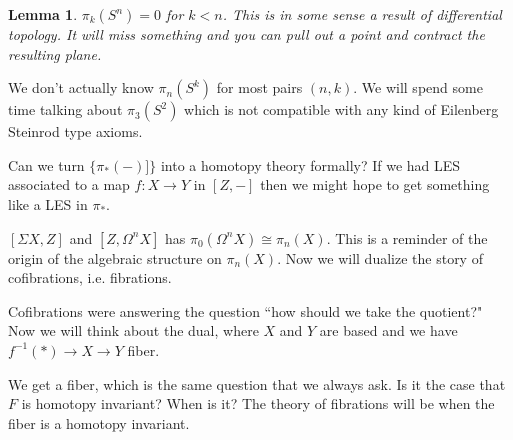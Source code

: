 \documentclass[12pt]{article}
\newtheorem{lemma}[theorem]{Lemma}
\theoremstyle{definition}
\begin{document}
	\begin{lemma}{1}
		$\pi_k(S^n)=0$ for $k<n$. This is in some sense a result of differential topology. It will miss something and you can pull out a point and contract the resulting plane. 
	\end{lemma}
	We don't actually know $\pi_n(S^k)$ for most pairs $(n,k)$. We will spend some time talking about $\pi_3(S^2)$ which is not compatible with any kind of Eilenberg Steinrod type axioms.  
	
	Can we turn $\{\pi_*(-)]\}$ into a homotopy theory formally? If we had LES associated to a map $f:X\to Y$ in $[Z,-]$ then we might hope to get something like a LES in $\pi_*$. 
	
	$[\Sigma X,Z]$ and $[Z,\Omega^n X]$ has $\pi_0(\Omega^n X)\cong \pi_n(X)$. This is a reminder of the origin of the algebraic structure on $\pi_n(X)$. Now we will dualize the story of cofibrations, i.e. fibrations. 
	
	Cofibrations were answering the question ``how should we take the quotient?" Now we will think about the dual, where $X$ and $Y$ are based and we have $f^{-1}(\ast)\to X\to Y$ fiber. 
	\begin{center}
	\end{center}
	We get a fiber, which is the same question that we always ask. Is it the case that $F$ is homotopy invariant?  When is it?  The theory of fibrations will be when the fiber is a homotopy invariant. 
	\begin{center}
	\end{center}
\end{document}
